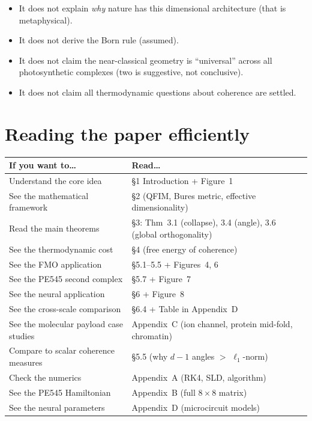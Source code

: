 \documentclass[11pt,a4paper]{article}
\begin{document}
\begin{itemize}[leftmargin=1.5em]
\item It does not explain \emph{why} nature has this dimensional architecture (that is metaphysical).
\item It does not derive the Born rule (assumed).
\item It does not claim the near-classical geometry is ``universal'' across all photosynthetic complexes (two is suggestive, not conclusive).
\item It does not claim all thermodynamic questions about coherence are settled.
\end{itemize}

\section*{Reading the paper efficiently}

\begin{table}[ht]
\centering
\begin{tabular}{@{}p{}p{}@{}}
\toprule
\textbf{If you want to\ldots} & \textbf{Read\ldots} \\
\midrule
Understand the core idea & \S1 Introduction + Figure~1 \\
See the mathematical framework & \S2 (QFIM, Bures metric, effective dimensionality) \\
Read the main theorems & \S3: Thm~3.1 (collapse), 3.4 (angle), 3.6 (global orthogonality) \\
See the thermodynamic cost & \S4 (free energy of coherence) \\
See the FMO application & \S5.1--5.5 + Figures~4, 6 \\
See the PE545 second complex & \S5.7 + Figure~7 \\
See the neural application & \S6 + Figure~8 \\
See the cross-scale comparison & \S6.4 + Table in Appendix~D \\
See the molecular payload case studies & Appendix~C (ion channel, protein mid-fold, chromatin) \\
Compare to scalar coherence measures & \S5.5 (why $d{-}1$ angles $>$ $\ell_1$-norm) \\
Check the numerics & Appendix~A (RK4, SLD, algorithm) \\
See the PE545 Hamiltonian & Appendix~B (full $8\times 8$ matrix) \\
See the neural parameters & Appendix~D (microcircuit models) \\
\bottomrule
\end{tabular}
\end{table}
\end{document}
